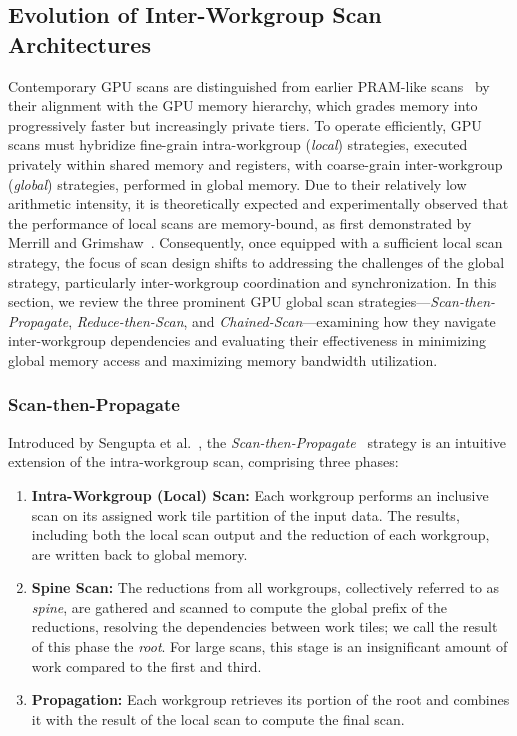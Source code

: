 \documentclass[sigconf]{acmart}
\begin{document}
\subsection{Evolution of Inter-Workgroup Scan Architectures}
Contemporary GPU scans are distinguished from earlier PRAM-like scans~\cite{} by their alignment with the GPU memory hierarchy, which grades memory into progressively faster but increasingly private tiers. To operate efficiently, GPU scans must hybridize fine-grain intra-workgroup (\emph{local}) strategies, executed privately within shared memory and registers, with coarse-grain inter-workgroup (\emph{global}) strategies, performed in global memory. Due to their relatively low arithmetic intensity, it is theoretically expected and experimentally observed that the performance of local scans are memory-bound, as first demonstrated by Merrill and Grimshaw~\cite{}. Consequently, once equipped with a sufficient local scan strategy, the focus of scan design shifts to addressing the challenges of the global strategy, particularly inter-workgroup coordination and synchronization. In this section, we review the three prominent GPU global scan strategies---\emph{Scan-then-Propagate}, \emph{Reduce-then-Scan}, and \emph{Chained-Scan}---examining how they navigate inter-workgroup dependencies and evaluating their effectiveness in minimizing global memory access and maximizing memory bandwidth utilization.

\subsubsection{Scan-then-Propagate}
Introduced by Sengupta et al.~\cite{10.5555/1280094.1280110}, the \emph{Scan-then-Propagate}~\cite{GPUGems3, Sengupta2008} strategy is an intuitive extension of the intra-workgroup scan, comprising three phases:
\begin{enumerate}
  \item \textbf{Intra-Workgroup (Local) Scan:} Each workgroup performs an inclusive scan on its assigned work tile partition of the input data. The results, including both the local scan output and the reduction of each workgroup, are written back to global memory.
  \item \textbf{Spine Scan:} The reductions from all workgroups, collectively referred to as \emph{spine}, are gathered and scanned to compute the global prefix of the reductions, resolving the dependencies between work tiles; we call the result of this phase the \emph{root}. For large scans, this stage is an insignificant amount of work compared to the first and third.
  \item \textbf{Propagation:} Each workgroup retrieves its portion of the root and combines it with the result of the local scan to compute the final scan.
\end{enumerate} 
\end{document}
